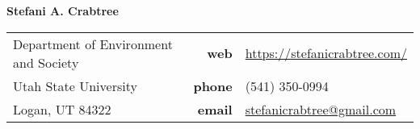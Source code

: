 \vspace{0.1in}

%
%  
%

%
%  
%

{\bf Stefani A. Crabtree}
\begin{list1}
\item[]
\begin{tabular}{@{}p{2.75in}rl}

Department of Environment and Society   & {\bf web} & \href{https://stefanicrabtree.com/}{https://stefanicrabtree.com/} \\            
Utah State University  & {\bf phone} & (541) 350-0994 \\       
Logan, UT 84322      & {\bf email} & \href{mailto: stefanicrabtree@gmail.com}{stefanicrabtree@gmail.com}\\
  
\end{tabular}
\end{list1}


